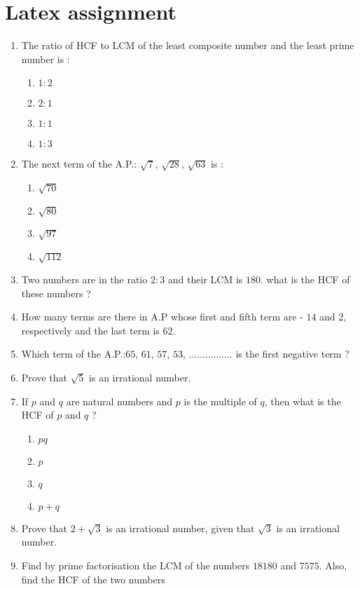 \documentclass[12pt]{article}
\begin{document}
\section*{\center Latex assignment}
\begin{enumerate}
    \item  The ratio of HCF to LCM of the least composite number and the least prime number is :
    \begin{enumerate}[label=(\alph*)]
      \item $1:2$
      \item $2:1$
      \item $1:1$
      \item $1:3$
    \end{enumerate}
    \item The next term of the A.P.: $\sqrt{7}$, $\sqrt{28}$, $\sqrt{63}$ is :
    \begin{enumerate}[label=(\alph*)]
      \item $\sqrt{70}$
      \item $\sqrt{80}$
      \item $\sqrt{97}$
      \item $\sqrt{112}$
    \end{enumerate}
    \item Two numbers are in the ratio $2:3$ and their LCM is $180$. what is the HCF of these numbers ?
    \item How many terms are there in A.P whose first and fifth term are - $14$ and $2$, respectively and the last term is $62$.
    \item Which term of the A.P.:$65$, $61$, $57$, $53$, ................ is the first negative term ?
    \item Prove that $\sqrt{5}$ is an irrational number.
    \item If $p$ and $q$ are natural numbers and $p$ is the multiple of $q$, then what is the HCF of $p$ and $q$ ?
    \begin{enumerate}[label=(\alph*)]
      \item $pq$
      \item $p$
      \item $q$
      \item $p+q$
      \end{enumerate}
    \item Prove that $2+\sqrt{3}$ is an irrational number, given that $\sqrt{3}$ is an irrational number.
        \item Find by prime factorisation the LCM of the numbers $18180$ and $7575$. Also, find the HCF of the two numbers

\end{enumerate}
\end{document}

